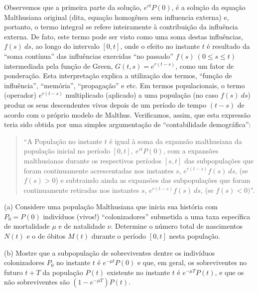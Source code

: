     Observemos que a primeira parte da solução, \(e^{rt} P(0)\), é a solução da equação Malthusiana original (dita, equação homogênea sem influencia externa) e, portanto, o termo integral se refere inteiramente à contribuição da influência externa. De fato, este termo pode ser visto como uma soma destas influências, \(f(s)\ ds\), ao longo do intervalo \([0,t]\), onde o efeito no instante \(t\) é resultado da ``soma contínua'' das influências exercidas ``no passado'' \(f(s)\ (0 \le s \le t)\) intermediada pela função de Green, \(G(t,s) = e^{r(t-s)}\), como um fator de ponderação. Esta interpretação explica a utilização dos termos, ``função de influência'', ``memória'', ``propagação'' e etc. Em termos populacionais, o termo (operador) \(e^{r(t-s)}\) multiplicado (aplicado) a uma população (no caso \(f(s)\ ds\)) produz os seus descendentes vivos depois de um período de tempo \((t-s)\) de acordo com o próprio modelo de Malthus. Verificamos, assim, que esta expressão teria sido obtida por uma simples argumentação de ``contabilidade demográfica'':
\begin{quotation}
    ``A População no instante \(t\) é igual à soma da expansão malthusiana da população inicial no período \([0,t],\ e^{rt} P(0)\), com a expansões malthusianas durante os respectivos períodos \([s,t]\) das subpopulações que foram continuamente acrescentadas nos instantes \(s\), \(e^{r(t-s)} f(s)\ ds\), (se \(f(s) > 0\)) e subtraindo ainda as expansões das subpopulações que foram continuamente retiradas nos instantes \(s\), \(e^{r(t-s)} f(s)\ ds\), (se \(f(s) < 0)\)''. 
\end{quotation}


    \begin{exercise} \quad
    
    \begin{description}
    \item (a) Considere uma população Malthusiana que inicia sua história com \(P_0 = P(0)\) indivíduos (vivos!) ``colonizadores'' submetida a uma taxa específica de mortalidade \(\mu\) e de natalidade \(\nu\). Determine o número total de nascimentos \(N(t)\) e o de óbitos \(M(t)\) durante o período \([0,t]\) nesta população.
    
    \item (b) Mostre que a subpopulação de sobreviventes dentre os indivíduos colonizadores \(P_0\) no instante \(t\) é \(e^{-\mu t} P(0)\) e que, em geral, os sobreviventes no futuro \(t+T\) da população \(P(t)\) existente no instante \(t\) é \(e^{-\mu T} P(t)\), e que os não sobreviventes são \((1-e^{-\mu T}) P(t)\).
    \end{description}
    \end{exercise}
    
